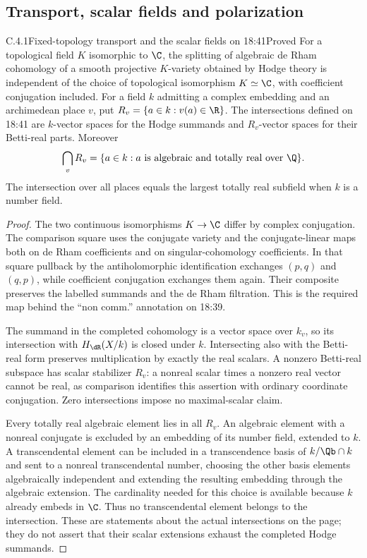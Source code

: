 \subsection{Transport, scalar fields and polarization}

\begin{result}{C.4.1}{Fixed-topology transport and the scalar fields on 18:41}{Proved}
For a topological field $K$ isomorphic to $\C$, the splitting of algebraic de Rham cohomology of a smooth projective $K$-variety obtained by Hodge theory is independent of the choice of topological isomorphism $K\simeq\C$, with coefficient conjugation included. For a field $k$ admitting a complex embedding and an archimedean place $v$, put $R_v=\{a\in k:v(a)\in\R\}$. The intersections defined on 18:41 are $k$-vector spaces for the Hodge summands and $R_v$-vector spaces for their Betti-real parts. Moreover
\[
 \bigcap_vR_v=\{a\in k:a\text{ is algebraic and totally real over }\Q\}.
\]
The intersection over all places equals the largest totally real subfield when $k$ is a number field.
\end{result}
\begin{proof}
The two continuous isomorphisms $K\to\C$ differ by complex conjugation. The comparison square uses the conjugate variety and the conjugate-linear maps both on de Rham coefficients and on singular-cohomology coefficients. In that square pullback by the antiholomorphic identification exchanges $(p,q)$ and $(q,p)$, while coefficient conjugation exchanges them again. Their composite preserves the labelled summands and the de Rham filtration. This is the required map behind the ``non comm.'' annotation on 18:39.

The summand in the completed cohomology is a vector space over $k_v$, so its intersection with $H_{\dR}(X/k)$ is closed under $k$. Intersecting also with the Betti-real form preserves multiplication by exactly the real scalars. A nonzero Betti-real subspace has scalar stabilizer $R_v$: a nonreal scalar times a nonzero real vector cannot be real, as comparison identifies this assertion with ordinary coordinate conjugation. Zero intersections impose no maximal-scalar claim.

Every totally real algebraic element lies in all $R_v$. An algebraic element with a nonreal conjugate is excluded by an embedding of its number field, extended to $k$. A transcendental element can be included in a transcendence basis of $k/\Qb\cap k$ and sent to a nonreal transcendental number, choosing the other basis elements algebraically independent and extending the resulting embedding through the algebraic extension. The cardinality needed for this choice is available because $k$ already embeds in $\C$. Thus no transcendental element belongs to the intersection. These are statements about the actual intersections on the page; they do not assert that their scalar extensions exhaust the completed Hodge summands.
\end{proof}


